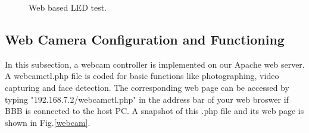\documentclass[12pt,journal,draftclsnofoot,onecolumn]{IEEEtran}
\begin{document}
\begin{figure}[ht]
	\centering
	
	\caption{Web based LED test.}\label{LEDTest}
\end{figure}

\subsection{Web Camera Configuration and Functioning}\label{Webcam}
In this subsection, a webcam controller is implemented on our Apache web server. A webcamctl.php file is coded for basic functions like photographing, video capturing and face detection. The corresponding web page can be accessed by typing "192.168.7.2/webcamctl.php" in the address bar of your web broswer if BBB is connected to the host PC. A snapshot of this .php file and its web page is shown in Fig.\ref{webcam}.
\end{document}
